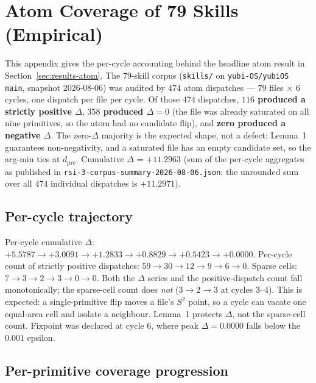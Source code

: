\documentclass[11pt,a4paper]{article}
\theoremstyle{plain}
\theoremstyle{remark}
\theoremstyle{plain}
\begin{document}
\appendix

\section{Atom Coverage of 79 Skills (Empirical)}
\label{app:atom-coverage}

This appendix gives the per-cycle accounting behind the headline atom result in Section~\ref{sec:results-atom}. The $79$-skill corpus (\texttt{skills/} on \texttt{yubi-OS/yubiOS main}, snapshot 2026-08-06) was audited by $474$ atom dispatches --- $79$ files $\times$ $6$ cycles, one dispatch per file per cycle. Of those $474$ dispatches, \textbf{$116$ produced a strictly positive $\Delta$}, \textbf{$358$ produced $\Delta = 0$} (the file was already saturated on all nine primitives, so the atom had no candidate flip), and \textbf{zero produced a negative $\Delta$}. The zero-$\Delta$ majority is the expected shape, not a defect: Lemma~1 guarantees non-negativity, and a saturated file has an empty candidate set, so the arg-min ties at $d_{\mathrm{pre}}$. Cumulative $\Delta$ = $\mathbf{+11.2963}$ (sum of the per-cycle aggregates as published in \texttt{rsi-3-corpus-summary-2026-08-06.json}; the unrounded sum over all $474$ individual dispatches is $+11.2971$).

\subsection{Per-cycle trajectory}

Per-cycle cumulative $\Delta$: $+5.5787 \to +3.0091 \to +1.2833 \to +0.8829 \to +0.5423 \to +0.0000$. Per-cycle count of strictly positive dispatches: $59 \to 30 \to 12 \to 9 \to 6 \to 0$. Sparse cells: $7 \to 3 \to 2 \to 3 \to 0 \to 0$. Both the $\Delta$ series and the positive-dispatch count fall monotonically; the sparse-cell count does \emph{not} ($3 \to 2 \to 3$ at cycles 3--4). This is expected: a single-primitive flip moves a file's $S^2$ point, so a cycle can vacate one equal-area cell and isolate a neighbour. Lemma~1 protects $\Delta$, not the sparse-cell count. Fixpoint was declared at cycle 6, where peak $\Delta = 0.0000$ falls below the $0.001$ epsilon.

\subsection{Per-primitive coverage progression}
\end{document}
